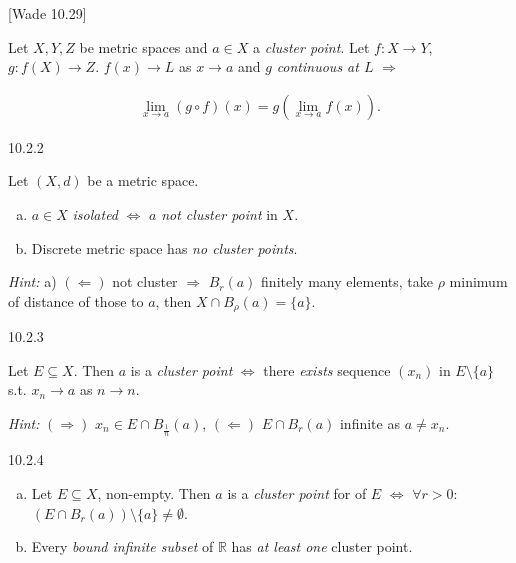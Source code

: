 \documentclass[10pt]{article} %
\newcommand{\cw}[1]{[Wade #1]}
\newcommand{\Hint}{\vspace{0.2em}\textit{Hint: }}
\begin{document}
\begin{multicols}{3}
\begin{theorem}{\cw{10.29}}{}

    Let $X,Y,Z$ be metric spaces and $a \in X$ a \emph{cluster point}. Let $f: X \to Y$, $g: f(X) \to Z$. $f(x) \to L$ as $x \to a$ and $g$ \emph{continuous at $L$} $\Rightarrow$

        \begin{align*}
            \lim_{x \to a} (g \circ f)(x) = g\left( \lim_{x \to a} f(x) \right).
        \end{align*}

\end{theorem}

\begin{exercise}{10.2.2}{}

    Let $(X,d)$ be a metric space.

        \begin{enumerate}[a)]
            \setlength{\parskip}{0em}
            \item $a \in X$ \emph{isolated} $\Leftrightarrow$ $a$ \emph{not cluster point} in $X$.
            \item Discrete metric space has \emph{no cluster points}.
        \end{enumerate}

    \Hint a) $(\Leftarrow)$ not cluster $\Rightarrow$ $B_r(a)$ finitely many elements, take $\rho$ minimum of distance of those to $a$, then $X \cap B_{\rho}(a) = \{a\}$.

\end{exercise}

\begin{exercise}{10.2.3}{}

    Let $E \subseteq X$. Then $a$ is a \emph{cluster point} $\Leftrightarrow$ there \emph{exists} sequence $(x_n)$ in $E \setminus \{a\}$ s.t. $x_n \to a$ as $n \to n$.

    \Hint $(\Rightarrow)$ $x_n \in E \cap B_{\frac{1}{n}}(a)$, $(\Leftarrow)$ $E \cap B_r(a)$ infinite as $a \neq x_n$.

\end{exercise}

\begin{exercise}{10.2.4}{}

    \begin{enumerate}[a)]
        \setlength{\parskip}{0em}
        \item Let $E \subseteq X$, non-empty. Then $a$ is a \emph{cluster point} for of $E$ $\Leftrightarrow$ $\forall r > 0:$ $(E \cap B_r(a)) \setminus \{a\} \neq \emptyset$.
        \item Every \emph{bound infinite subset} of $\mathbb{R}$ has \emph{at least one} cluster point.
    \end{enumerate}


\end{exercise}
\end{multicols}
\end{document}
